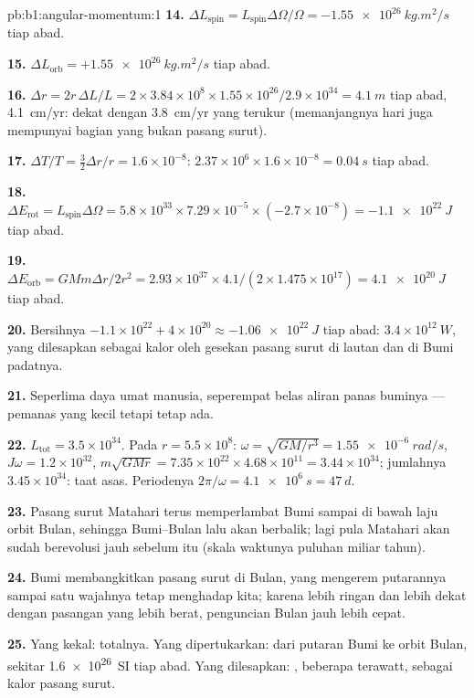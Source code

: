 \begin{solution}{pb:b1:angular-momentum:1}
\textbf{14.} $\Delta L_{\text{spin}} = L_{\text{spin}}\Delta\Omega/\Omega =
\qty{-1.55e26}{kg.m^2/s}$ tiap abad.

\textbf{15.} $\Delta L_{\text{orb}} = +\qty{1.55e26}{kg.m^2/s}$ tiap abad.

\textbf{16.} $\Delta r = 2r\,\Delta L/L = 2 \times 3.84\times10^8 \times 1.55
\times10^{26}/2.9\times10^{34} = \qty{4.1}{m}$ tiap abad, \qty{4.1}{cm/yr}:
dekat dengan \qty{3.8}{cm/yr} yang terukur (memanjangnya hari juga
mempunyai bagian yang bukan pasang surut).

\textbf{17.} $\Delta T/T = \tfrac32\Delta r/r = 1.6\times10^{-8}$: $2.37\times
10^6 \times 1.6\times10^{-8} = \qty{0.04}{s}$ tiap abad.

\textbf{18.} $\Delta E_{\text{rot}} = L_{\text{spin}}\Delta\Omega = 5.8\times10^{33}
\times 7.29\times10^{-5} \times (-2.7\times10^{-8}) = \qty{-1.1e22}{J}$ tiap
abad.

\textbf{19.} $\Delta E_{\text{orb}} = GMm\Delta r/2r^2 = 2.93\times10^{37}
\times 4.1/(2 \times 1.475\times10^{17}) = \qty{+4.1e20}{J}$ tiap abad.

\textbf{20.} Bersihnya $-1.1\times10^{22} + 4\times10^{20} \approx \qty{-1.06e22}{J}$
tiap abad: $3.4\times10^{12}\ \unit{W}$, yang dilesapkan sebagai kalor
oleh gesekan pasang surut di lautan dan di Bumi padatnya.

\textbf{21.} Seperlima daya umat manusia, seperempat belas aliran panas
buminya --- pemanas yang kecil tetapi tetap ada.

\textbf{22.} $L_{\text{tot}} = 3.5\times10^{34}$. Pada $r = 5.5\times10^8$:
$\omega = \sqrt{GM/r^3} = \qty{1.55e-6}{rad/s}$, $J\omega = 1.2\times10^{32}$,
$m\sqrt{GMr} = 7.35\times10^{22} \times 4.68\times10^{11} = 3.44\times10^{34}$;
jumlahnya $3.45\times10^{34}$: taat asas. Periodenya $2\pi/\omega = \qty{4.1e6}{s}
= \qty{47}{d}$.

\textbf{23.} Pasang surut Matahari terus memperlambat Bumi sampai di
bawah laju orbit Bulan, sehingga  Bumi--Bulan lalu akan berbalik;
lagi pula Matahari akan sudah berevolusi jauh sebelum itu (skala
waktunya puluhan miliar tahun).

\textbf{24.} Bumi membangkitkan pasang surut di Bulan, yang mengerem
putarannya sampai satu wajahnya tetap menghadap kita; karena lebih
ringan dan lebih dekat dengan pasangan yang lebih berat, penguncian
Bulan jauh lebih cepat.

\textbf{25.} Yang kekal:  totalnya. Yang dipertukarkan:
 dari putaran Bumi ke orbit Bulan, sekitar \qty{1.6e26}{SI}
tiap abad. Yang dilesapkan: , beberapa terawatt, sebagai
kalor pasang surut.
\end{solution}
